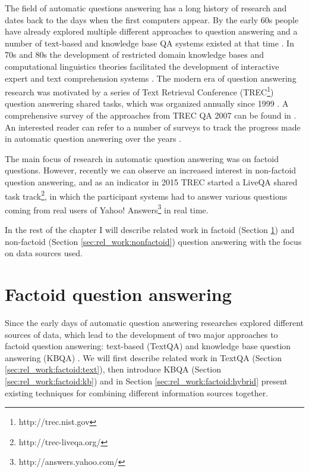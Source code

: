 %

\label{chap:related}

The field of automatic questions answering has a long history of research and dates back to the days when the first computers appear.
By the early 60s people have already explored multiple different approaches to question answering and a number of text-based and knowledge base QA systems existed at that time \cite{Simmons:1965:AEQ:363707.363732,Simmons:1970:NLQ:361953.361963}.
In 70s and 80s the development of restricted domain knowledge bases and computational linguistics theories facilitated the development of interactive expert and text comprehension systems \cite{androutsopoulos1995natural,shortliffe1975model,woods1977lunar,wilensky1988berkeley}.
The modern era of question answering research was motivated by a series of Text Retrieval Conference (TREC\footnote{http://trec.nist.gov}) question answering shared tasks, which was organized annually since 1999 \cite{voorhees2001trec}.
A comprehensive survey of the approaches from TREC QA 2007 can be found in \cite{dang2007overview}.
An interested reader can refer to a number of surveys to track the progress made in automatic question answering over the years  \cite{hirschman2001natural,andrenucci2005automated,wang2006survey,Kolomiyets:2011:SQA:2046840.2047162,prager2006open,allam2012question,gupta2012survey}.

The main focus of research in automatic question answering was on factoid questions.
However, recently we can observe an increased interest in non-factoid question answering, and as an indicator in 2015 TREC started a LiveQA shared task track\footnote{http://trec-liveqa.org/}, in which the participant systems had to answer various questions coming from real users of Yahoo! Answers\footnote{http://answers.yahoo.com/} in real time.

In the rest of the chapter I will describe related work in factoid (Section \ref{sec:rel_work:factoid}) and non-factoid (Section \ref{sec:rel_work:nonfactoid}) question answering with the focus on data sources used.

\section{Factoid question answering}
\label{sec:rel_work:factoid}

Since the early days of automatic question answering researches explored different sources of data, which lead to the development of two major approaches to factoid question answering: text-based (TextQA) and knowledge base question answering (KBQA) \cite{Simmons:1965:AEQ:363707.363732}.
We will first describe related work in TextQA (Section \ref{sec:rel_work:factoid:text}), then introduce KBQA (Section \ref{sec:rel_work:factoid:kb}) and in Section \ref{sec:rel_work:factoid:hybrid} present existing techniques for combining different information sources together.

